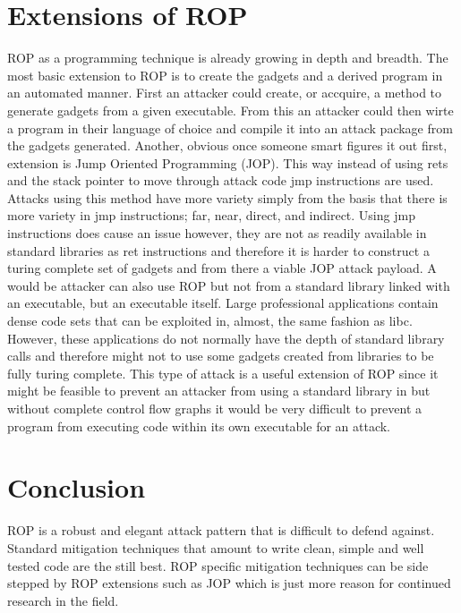 \documentclass[11pt]{amsart}
\begin{document}
\section*{Extensions of ROP}
ROP as a programming technique is already growing in depth and breadth. The most basic extension to ROP is to create the gadgets and a derived program in an automated manner. First an attacker could create, or accquire, a method to generate gadgets from a given executable. From this an attacker could then wirte a program in their language of choice and compile it into an attack package from the gadgets generated.\newline
Another, obvious once someone smart figures it out first, extension is Jump Oriented Programming (JOP). This way instead of using rets and the stack pointer to move through attack code jmp instructions are used. Attacks using this method have more variety simply from the basis that there is more variety in jmp instructions; far, near, direct, and indirect. Using jmp instructions does cause an issue however, they are not as readily available in standard libraries as ret instructions and therefore it is harder to construct a turing complete set of gadgets and from there a viable JOP attack payload.\newline
A would be attacker can also use ROP but not from a standard library linked with an executable, but an executable itself. Large professional applications contain dense code sets that can be exploited in, almost, the same fashion as libc. However, these applications do not normally have the depth of standard library calls and therefore might not to use some gadgets created from libraries to be fully turing complete. This type of attack is a useful extension of ROP since it might be feasible to prevent an attacker from using a standard library in but without complete control flow graphs it would be very difficult to prevent a program from executing code within its own executable for an attack.
\section*{Conclusion}
ROP is a robust and elegant attack pattern that is difficult to defend against. Standard mitigation techniques that amount to write clean, simple and well tested code are the still best. ROP specific mitigation techniques can be side stepped by ROP extensions such as JOP which is just more reason for continued research in the field.
\end{document}
